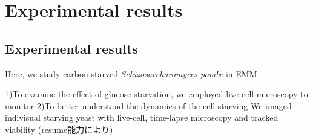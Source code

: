 \chapter{Experimental results}
\section{Experimental results}
Here, we study carbon-starved \textit{Schizosaccharomyces pombe} in EMM

1)To examine the effect of glucose starvation, we employed live-cell microscopy to monitor 
2)To better understand the dynamics of the cell starving We imaged indivisual starving yeast with live-cell, time-lapse microscopy and tracked viability (resume能力により)